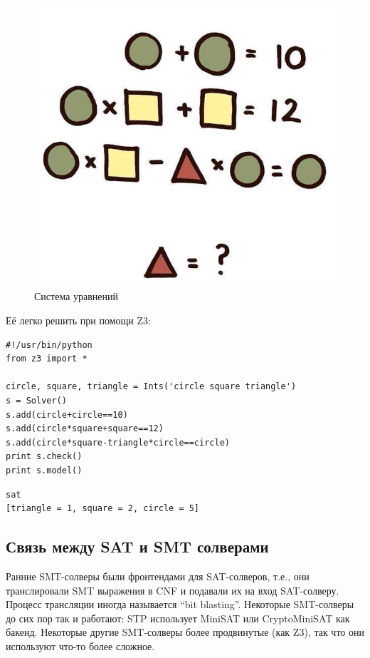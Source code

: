 \begin{figure}[H]
\centering
\includegraphics[scale=0.3]{SMT/equation.jpg}
\caption{Система уравнений}
\end{figure}

Её легко решить при помощи Z3:

\begin{lstlisting}
#!/usr/bin/python
from z3 import *

circle, square, triangle = Ints('circle square triangle')
s = Solver()
s.add(circle+circle==10)
s.add(circle*square+square==12)
s.add(circle*square-triangle*circle==circle)
print s.check()
print s.model()
\end{lstlisting}

\begin{lstlisting}
sat
[triangle = 1, square = 2, circle = 5]
\end{lstlisting}

\subsection{Связь между \ac{SAT} и \ac{SMT} солверами}

Ранние \ac{SMT}-солверы были фронтендами для \ac{SAT}-солверов, т.е.,
они транслировали SMT выражения в \ac{CNF} и подавали их на вход SAT-солверу.
Процесс трансляции иногда называется ``bit blasting''.
Некоторые \ac{SMT}-солверы до сих пор так и работают: STP использует MiniSAT или CryptoMiniSAT как бакенд.
Некоторые другие \ac{SMT}-солверы более продвинутые (как Z3), так что они используют что-то более сложное.








